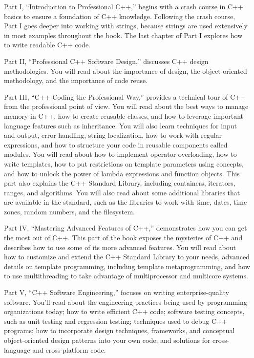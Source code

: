Part I, “Introduction to Professional C++,” begins with a crash course in C++ basics to ensure a foundation of C++ knowledge. Following the crash course, Part I goes deeper into working with strings, because strings are used extensively in most examples throughout the book. The last chapter of Part I explores how to write readable C++ code.

Part II, “Professional C++ Software Design,” discusses C++ design methodologies. You will read about the importance of design, the object-oriented methodology, and the importance of code reuse.

Part III, “C++ Coding the Professional Way,” provides a technical tour of C++ from the professional point of view. You will read about the best ways to manage memory in C++, how to create reusable classes, and how to leverage important language features such as inheritance. You will also learn techniques for input and output, error handling, string localization, how to work with regular expressions, and how to structure your code in reusable components called modules. You will read about how to implement operator overloading, how to write templates, how to put restrictions on template parameters using concepts, and how to unlock the power of lambda expressions and function objects. This part also explains the C++ Standard Library, including containers, iterators, ranges, and algorithms. You will also read about some additional libraries that are available in the standard, such as the libraries to work with time, dates, time zones, random numbers, and the filesystem.

Part IV, “Mastering Advanced Features of C++,” demonstrates how you can get the most out of C++. This part of the book exposes the mysteries of C++ and describes how to use some of its more advanced features. You will read about how to customize and extend the C++ Standard Library to your needs, advanced details on template programming, including template metaprogramming, and how to use multithreading to take advantage of multiprocessor and multicore systems.

Part V, “C++ Software Engineering,” focuses on writing enterprise-quality software. You’ll read about the engineering practices being used by programming organizations today; how to write efficient C++ code; software testing concepts, such as unit testing and regression testing; techniques used to debug C++ programs; how to incorporate design techniques, frameworks, and conceptual object-oriented design patterns into your own code; and solutions for cross-language and cross-platform code.

